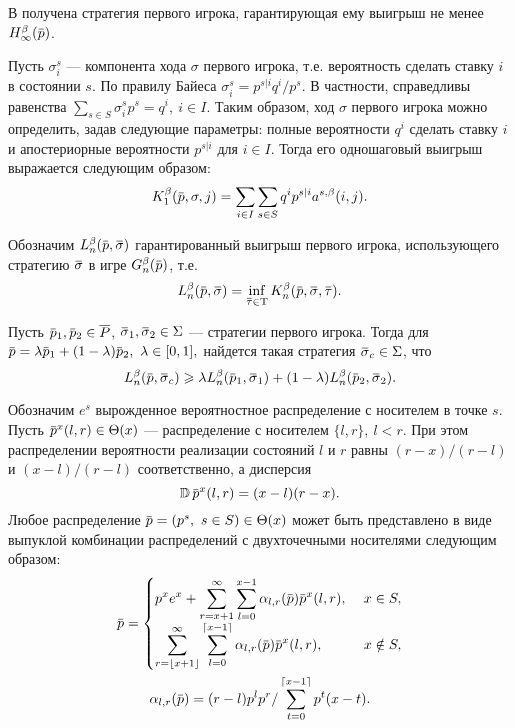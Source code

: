 В  получена стратегия первого игрока, гарантирующая ему выигрыш не менее $\High(\p)$.

Пусть $\sigma^s_i$ --- компонента хода $\sigma$ первого игрока, т.е. вероятность сделать ставку $i$ в состоянии $s$.
По правилу Байеса $\sigma^s_i = p^{s|i} q^i / p^s$.
В частности, справедливы равенства $\sum_{s \in S} \sigma^s_i p^s = q^i,\ i \in I$.
Таким образом, ход $\sigma$ первого игрока можно определить, задав следующие параметры: полные вероятности $q^i$ сделать ставку $i$ и апостериорные вероятности $p^{s|i}$ для $i \in I$.
Тогда его одношаговый выигрыш выражается следующим образом:
\begin{equation}
  \label{ch2:lower-bound:eq:K1(q,pi)}
  \K[1](\p, \sigma, j) = \sum_{i \in I} \sum_{s \in S} q^i p^{s|i} \as(i, j).
\end{equation}

Обозначим $\Low[n](\p, \sigmav)$ гарантированный выигрыш первого игрока, использующего стратегию $\sigmav$ в игре $\theG[n](\p)$, т.е.
\[
  \Low[n](\p, \sigmav) = \inf_{\tauv \in \Tau} \K[n](\p, \sigmav, \tauv).
\]
\begin{lemma}
  \label{ch2:lower-bound:lemma:convex-combination}
  Пусть $\p_1, \p_2 \in \MM$, $\sigmav_1, \sigmav_2 \in \Sigma$ --- стратегии первого игрока.
  Тогда для $\p = \lambda \p_1 + (1-\lambda) \p_2,\ \lambda \in [0, 1],$ найдется такая стратегия $\sigmav_c \in \Sigma$, что
  \[
    \Low[n](\p, \sigmav_c) \geqslant
    \lambda \Low[n](\p_1, \sigmav_1) + (1-\lambda) \Low[n](\p_2, \sigmav_2).
  \]
\end{lemma}

Обозначим $e^s$ вырожденное вероятностное распределение с носителем в точке $s$.
Пусть $\p^x(l, r) \in \Theta(x)$ --- распределение с носителем $\{l, r\},\ l<r$.
При этом распределении вероятности реализации состояний $l$ и $r$ равны $(r-x)/(r-l)$ и $(x-l)/(r-l)$ соответственно, а дисперсия
\[
  \D \p^x(l, r) = (x - l)(r - x).
\]
Любое распределение $\p = (p^s,\ s \in S) \in \Theta(x)$ может быть представлено в виде выпуклой комбинации распределений с двухточечными носителями следующим образом:
\begin{gather}
  \label{ch2:lower-bound:eq:prob-decomp-sum}
  \p = \begin{cases}
    \displaystyle
    p^x e^x + \sum_{r=x+1}^\infty \sum_{l=0}^{x-1} \alpha_{l,r}(\p) \p^x(l, r),\ & x \in S,\\
    \displaystyle
    \sum_{r=\floor{x+1}}^\infty \sum_{l=0}^{\ceil{x-1}} \alpha_{l,r}(\p) \p^x(l, r),\ & x \notin S,\\
  \end{cases}\\
  \alpha_{l,r}(\p) = (r-l) p^l p^r / \sum_{t=0}^{\ceil{x-1}} p^t (x-t). \nonumber
\end{gather}

